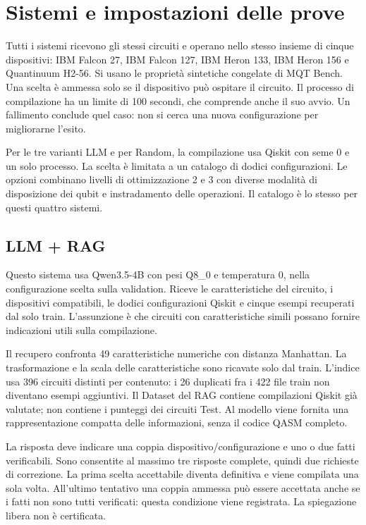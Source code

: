 \section{Sistemi e impostazioni delle prove}
Tutti i sistemi ricevono gli stessi circuiti e operano nello stesso insieme
di cinque dispositivi: IBM Falcon 27, IBM Falcon 127, IBM Heron 133,
IBM Heron 156 e Quantinuum H2-56. Si usano le proprietà sintetiche congelate
di MQT Bench. Una scelta è ammessa solo se il dispositivo può ospitare
il circuito. Il processo di compilazione ha un limite di 100 secondi,
che comprende anche il suo avvio. Un fallimento conclude quel caso:
non si cerca una nuova configurazione per migliorarne l'esito.

Per le tre varianti LLM e per Random, la compilazione usa Qiskit con seme 0 e un solo
processo. La scelta è limitata a un catalogo di dodici configurazioni.
Le opzioni combinano livelli di ottimizzazione 2 e 3 con diverse modalità
di disposizione dei qubit e instradamento delle operazioni.
Il catalogo è lo stesso per questi quattro sistemi.

\subsection{LLM + RAG}
Questo sistema usa Qwen3.5-4B con pesi Q8\_0 e temperatura 0, nella
configurazione scelta sulla validation. Riceve le caratteristiche del circuito,
i dispositivi compatibili, le dodici configurazioni Qiskit e cinque esempi
recuperati dal solo train. L'assunzione è che circuiti con caratteristiche
simili possano fornire indicazioni utili sulla compilazione.

Il recupero confronta 49 caratteristiche numeriche con distanza Manhattan.
La trasformazione e la scala delle caratteristiche sono ricavate solo dal
train. L'indice usa 396 circuiti distinti per contenuto: i 26 duplicati
fra i 422 file train non diventano esempi aggiuntivi.
Il Dataset del RAG contiene compilazioni Qiskit già valutate; non contiene
i punteggi dei circuiti Test. Al modello viene fornita una rappresentazione
compatta delle informazioni, senza il codice QASM completo.

La risposta deve indicare una coppia dispositivo/configurazione e uno o due
fatti verificabili. Sono consentite al massimo tre risposte complete,
quindi due richieste di correzione. La prima scelta accettabile diventa
definitiva e viene compilata una sola volta. All'ultimo tentativo una coppia
ammessa può essere accettata anche se i fatti non sono tutti verificati:
questa condizione viene registrata. La spiegazione libera non è certificata.

